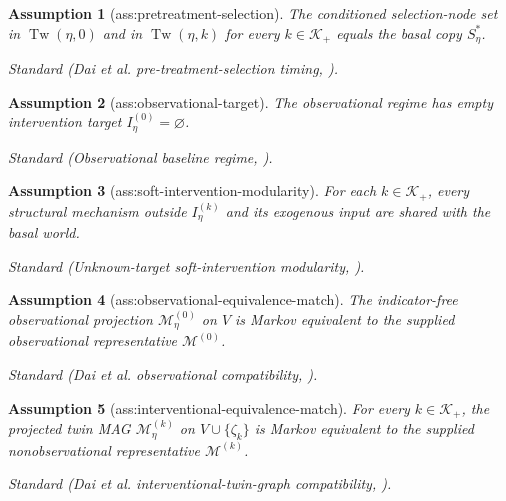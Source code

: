 \documentclass{article}
\newtheorem{assumption}{Assumption}
\begin{document}
\begin{assumption}[ass:pretreatment-selection]\label{ass:pretreatment-selection}
The conditioned selection-node set in \(\operatorname{Tw}(\eta,0)\) and in \(\operatorname{Tw}(\eta,k)\) for every \(k\in\mathcal K_+\) equals the basal copy \(S_\eta^*\).
\par\smallskip\noindent\emph{Standard} (Dai et al. pre-treatment-selection timing, \cite{DaiEtAl2025SelectionIntervention}).
\end{assumption}

\begin{assumption}[ass:observational-target]\label{ass:observational-target}
The observational regime has empty intervention target \(I_\eta^{(0)}=\varnothing\).
\par\smallskip\noindent\emph{Standard} (Observational baseline regime, \cite{DaiEtAl2025SelectionIntervention}).
\end{assumption}

\begin{assumption}[ass:soft-intervention-modularity]\label{ass:soft-intervention-modularity}
For each \(k\in\mathcal K_+\), every structural mechanism outside \(I_\eta^{(k)}\) and its exogenous input are shared with the basal world.
\par\smallskip\noindent\emph{Standard} (Unknown-target soft-intervention modularity, \cite{JaberKocaogluShanmugamBareinboim2020}).
\end{assumption}

\begin{assumption}[ass:observational-equivalence-match]\label{ass:observational-equivalence-match}
The indicator-free observational projection \(\mathcal M_\eta^{(0)}\) on \(V\) is Markov equivalent to the supplied observational representative \(\mathcal M^{(0)}\).
\par\smallskip\noindent\emph{Standard} (Dai et al. observational compatibility, \cite{DaiEtAl2025SelectionIntervention}).
\end{assumption}

\begin{assumption}[ass:interventional-equivalence-match]\label{ass:interventional-equivalence-match}
For every \(k\in\mathcal K_+\), the projected twin MAG \(\mathcal M_\eta^{(k)}\) on \(V\cup\{\zeta_k\}\) is Markov equivalent to the supplied nonobservational representative \(\mathcal M^{(k)}\).
\par\smallskip\noindent\emph{Standard} (Dai et al. interventional-twin-graph compatibility, \cite{DaiEtAl2025SelectionIntervention}).
\end{assumption}
\end{document}

